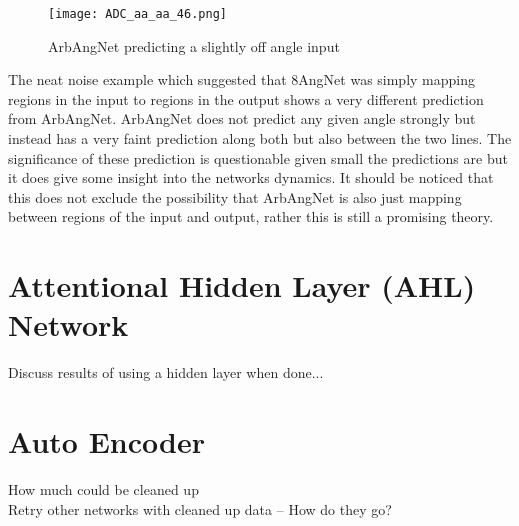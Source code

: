 \begin{figure}[h]
    \centering
    \texttt{[image: ADC\_aa\_aa\_46.png]}
    \caption{ArbAngNet predicting a slightly off angle input}
    \label{fig:ADC_aaaa_fork}
\end{figure}


The neat noise example which suggested that 8AngNet was simply mapping regions in the input to regions in the output shows a very different prediction from ArbAngNet.
ArbAngNet does not predict any given angle strongly but instead has a very faint prediction along both but also between the two lines. 
The significance of these prediction is questionable given small the predictions are but it does give some insight into the networks dynamics.
It should be noticed that this does not exclude the possibility that ArbAngNet is also just mapping between regions of the input and output, rather this is still a promising theory.


\section{Attentional Hidden Layer (AHL) Network}

Discuss results of using a hidden layer when done...


\section{Auto Encoder}
How much could be cleaned up \\
Retry other networks with cleaned up data -- How do they go? \\

